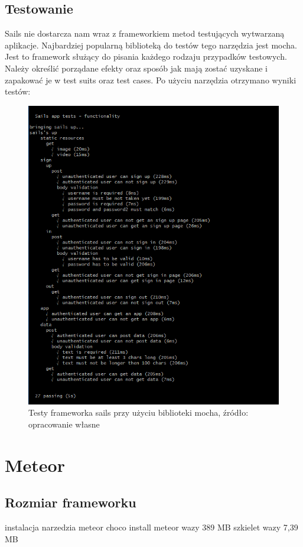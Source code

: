 \documentclass[12pt]{report}
\begin{document}
    \subsection{Testowanie}
      Sails nie dostarcza nam wraz z frameworkiem metod testujących wytwarzaną aplikacje. 
      Najbardziej popularną biblioteką do testów tego narzędzia jest mocha.
      Jest to framework służący do pisania każdego rodzaju przypadków testowych.
      Należy określić porządane efekty oraz sposób jak mają zostać uzyskane i zapakować je w test suits oraz test cases.
      Po użyciu narzędzia otrzymano wyniki testów:
      \begin{figure}[!hb]
        \centering
        \includegraphics[width=\textwidth,height=\textheight,keepaspectratio]{test_sails.png} 
        \caption{Testy frameworka sails przy użyciu biblioteki mocha, źródło: opracowanie własne}
      \end{figure}

  \section{Meteor}
    \subsection{Rozmiar frameworku}
    instalacja narzedzia meteor choco install meteor wazy 389 MB
    szkielet wazy 7,39 MB
    
\end{document}
